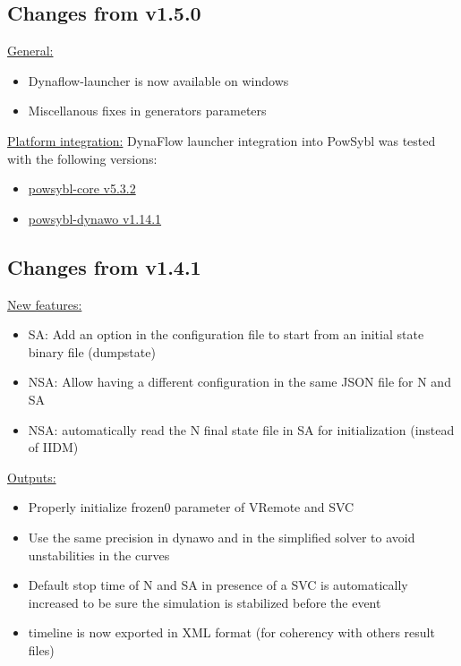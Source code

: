\documentclass[a4paper, 12pt]{report}
\begin{document}
\subsection{Changes from v1.5.0}

\underline{General:}

\begin{itemize}
\item Dynaflow-launcher is now available on windows
\item Miscellanous fixes in generators parameters
\end{itemize}

\underline{Platform integration:}
DynaFlow launcher integration into PowSybl was tested with the following versions:
\begin{itemize}
\item \href{https://github.com/powsybl/powsybl-core/releases/tag/v5.3.2}{powsybl-core v5.3.2}
\item \href{https://github.com/powsybl/powsybl-dynawo/releases/tag/v1.14.1}{powsybl-dynawo v1.14.1}
\end{itemize}

\subsection{Changes from v1.4.1}

\underline{New features:}

\begin{itemize}
\item SA: Add an option in the configuration file to start from an initial state binary file (dumpstate)
\item NSA: Allow having a different configuration in the same JSON file for N and SA
\item NSA: automatically read the N final state file in SA for initialization (instead of IIDM)
\end{itemize}

\underline{Outputs:}

\begin{itemize}
\item Properly initialize frozen0 parameter of VRemote and SVC
\item Use the same precision in dynawo and in the simplified solver to avoid unstabilities in the curves
\item Default stop time of N and SA in presence of a SVC is automatically increased to be sure the simulation is stabilized before the event
\item timeline is now exported in XML format (for coherency with others result files)
\end{itemize}
\end{document}
